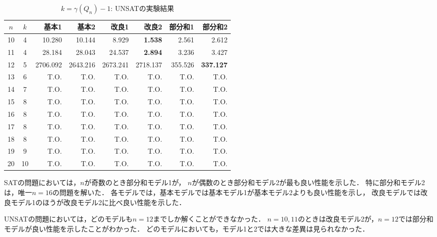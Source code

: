 \begin{table}[ht]
 \caption{$k=\gamma(Q_n)-1$: UNSATの実験結果}
 \label{tb:exUNSAT}
 \centering 
 \begin{tabular}{c|c|r|r|r|r|r|r} \hline
  $n$ & $k$ & 基本1 & 基本2 & 改良1 & 改良2 & 部分和1 & 部分和2 \\ \hline
  10 & 4 & 10.280 & 10.144 & 8.929 & \textbf{1.538} & 2.561 & 2.612 \\
  11 & 4 & 28.184 & 28.043 & 24.537 & \textbf{2.894} & 3.236 & 3.427 \\
  12 & 5 & 2706.092 & 2643.216 & 2673.241 & 2718.137 & 355.526 & \textbf{337.127} \\
  13 & 6 & T.O. & T.O. & T.O. & T.O. & T.O. & T.O. \\  
  14 & 7 & T.O. & T.O. & T.O. & T.O. & T.O. & T.O. \\   
  15 & 8 & T.O. & T.O. & T.O. & T.O. & T.O. & T.O. \\  
  16 & 8 & T.O. & T.O. & T.O. & T.O. & T.O. & T.O. \\
  17 & 8 & T.O. & T.O. & T.O. & T.O. & T.O. & T.O. \\
  18 & 8 & T.O. & T.O. & T.O. & T.O. & T.O. & T.O. \\
  19 & 9 & T.O. & T.O. & T.O. & T.O. & T.O. & T.O. \\
  20 & 10 & T.O. & T.O. & T.O. & T.O. & T.O. & T.O. \\ \hline
 \end{tabular}
\end{table}

SATの問題においては，$n$が奇数のとき部分和モデル1が，
$n$が偶数のとき部分和モデル2が最も良い性能を示した．
特に部分和モデル2は，唯一$n=16$の問題を解いた．
各モデルでは，基本モデルでは基本モデル1が基本モデル2よりも良い性能を示し，
改良モデルでは改良モデル1のほうが改良モデル2に比べ良い性能を示した．

UNSATの問題においては，どのモデルも$n=12$までしか解くことができなかった．
$n=10,11$のときは改良モデル2が，$n=12$では部分和モデルが良い性能を示したことがわかった．
どのモデルにおいても，モデル1と2では大きな差異は見られなかった．
